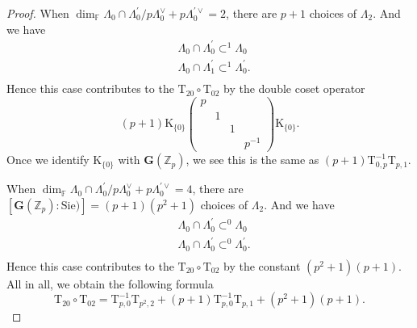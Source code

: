 \documentclass[10pt]{amsart}
\numberwithin{equation}{section}
\theoremstyle{definition}
\def\FF{\mathbb{F}}
\def\bfG{\mathbf{G}}
\def\ZZ{\mathbb{Z}}
\def\rmK{\mathrm{K}}
\def\rmT{\mathrm{T}}
\begin{document}
\begin{proof}
When $\dim_{\FF}\Lambda_{0}\cap\Lambda^{\prime}_{0}/p\Lambda^{\vee}_{0}+p\Lambda^{\prime\vee}_{0}=2$, there are $p+1$ choices of $\Lambda_{2}$. And we have 
\begin{equation*}
\begin{aligned}
&\Lambda_{0}\cap\Lambda^{\prime}_{0}\subset^{1} \Lambda_{0}\\ 
&\Lambda_{0}\cap\Lambda^{\prime}_{1}\subset^{1} \Lambda^{\prime}_{0}.\\
\end{aligned}
\end{equation*}
Hence this case contributes to the $\rmT_{20}\circ\rmT_{02}$ by the double coset operator
\begin{equation*}
(p+1)\rmK_{\{0\}}\begin{pmatrix}p&&&\\&1&&\\&&1&\\&&&p^{-1} \end{pmatrix}\rmK_{\{0\}}.
\end{equation*}
Once we identify $\rmK_{\{0\}}$ with $\bfG(\ZZ_{p})$, we see this is the same as $(p+1)\mathrm{T}^{-1}_{0,p}\rmT_{p, 1}$.

When $\dim_{\FF}\Lambda_{0}\cap\Lambda^{\prime}_{0}/p\Lambda^{\vee}_{0}+p\Lambda^{\prime\vee}_{0}=4$, there are $[\bfG(\ZZ_{p}):\mathrm{Sie})]=(p+1)(p^{2}+1)$  choices of $\Lambda_{2}$. And we have 
\begin{equation*}
\begin{aligned}
&\Lambda_{0}\cap\Lambda^{\prime}_{0}\subset^{0} \Lambda_{0}\\ 
&\Lambda_{0}\cap\Lambda^{\prime}_{0}\subset^{0} \Lambda^{\prime}_{0}.\\ 
\end{aligned}
\end{equation*}
Hence this case contributes to the $\rmT_{20}\circ\rmT_{02}$ by the constant $(p^{2}+1)(p+1)$. All in all, we obtain the following formula
\begin{equation}\label{T02T20}
\rmT_{20}\circ\rmT_{02}= \mathrm{T}^{-1}_{p, 0}\rmT_{p^{2}, 2}+(p+1)\mathrm{T}^{-1}_{p, 0}\rmT_{p, 1}+(p^{2}+1)(p+1).
\end{equation} 


\end{proof}
\end{document}
